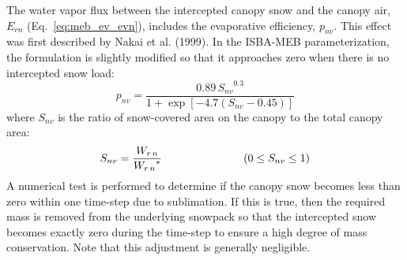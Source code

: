 The water vapor flux 
%
%
between the intercepted canopy snow and the canopy air,  $E_{rn}$
(Eq.~\ref{eq:meb_ev_evn}),
includes the evaporative efficiency, $p_{nv}$.
This effect was first described by 
Nakai et al. (1999)\nocite{Nakai99}. 
In the ISBA-MEB parameterization, 
the formulation is slightly modified so that it approaches zero when there is no
intercepted snow load:
%
\begin{equation}
  \label{eq:meb_rd_snowcanbeta}
p_{nv} = \frac{0.89\, {S_{nv}}^{0.3}}{1+\exp\left[-4.7(S_{nv}-0.45)\right]} 
\end{equation}
%
where $S_{nv}$ is the ratio of snow-covered area on the canopy to the
total canopy area:
%
\begin{equation}
  \label{eq:meb_rd_snowcanrs}
  S_{nv} = \frac{W_{r\,n}}{{W_{r\,n}}^\ast}
\hskip1.in
\left( 0 \leq S_{nv} \leq 1\right)
\end{equation}
%
A numerical test is performed 
to determine if the canopy snow becomes less than zero
within one time-step due to sublimation. 
If this is true, then the required mass is removed from the underlying
snowpack 
so that the
intercepted snow becomes exactly zero during the 
time-step to ensure a high degree of mass conservation. Note that this
adjustment is generally negligible.

